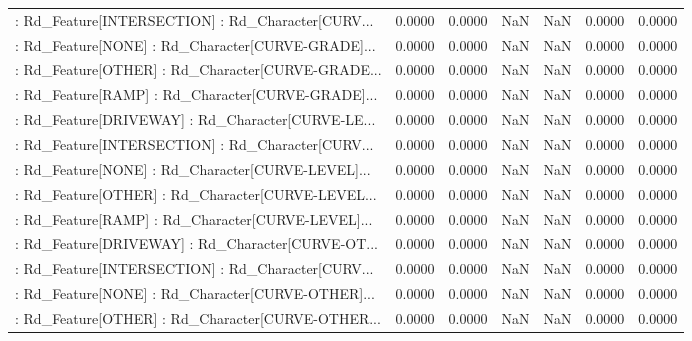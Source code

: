 \begin{longtable}{p{4cm}cccccc}
 : Rd\_Feature[INTERSECTION] : Rd\_Character[CURV... &            0.0000 &            0.0000 &     NaN &          NaN &             0.0000 &            0.0000 \\
 : Rd\_Feature[NONE] : Rd\_Character[CURVE-GRADE]... &            0.0000 &            0.0000 &     NaN &          NaN &             0.0000 &            0.0000 \\
 : Rd\_Feature[OTHER] : Rd\_Character[CURVE-GRADE... &            0.0000 &            0.0000 &     NaN &          NaN &             0.0000 &            0.0000 \\
 : Rd\_Feature[RAMP] : Rd\_Character[CURVE-GRADE]... &            0.0000 &            0.0000 &     NaN &          NaN &             0.0000 &            0.0000 \\
 : Rd\_Feature[DRIVEWAY] : Rd\_Character[CURVE-LE... &            0.0000 &            0.0000 &     NaN &          NaN &             0.0000 &            0.0000 \\
 : Rd\_Feature[INTERSECTION] : Rd\_Character[CURV... &            0.0000 &            0.0000 &     NaN &          NaN &             0.0000 &            0.0000 \\
 : Rd\_Feature[NONE] : Rd\_Character[CURVE-LEVEL]... &            0.0000 &            0.0000 &     NaN &          NaN &             0.0000 &            0.0000 \\
 : Rd\_Feature[OTHER] : Rd\_Character[CURVE-LEVEL... &            0.0000 &            0.0000 &     NaN &          NaN &             0.0000 &            0.0000 \\
 : Rd\_Feature[RAMP] : Rd\_Character[CURVE-LEVEL]... &            0.0000 &            0.0000 &     NaN &          NaN &             0.0000 &            0.0000 \\
 : Rd\_Feature[DRIVEWAY] : Rd\_Character[CURVE-OT... &            0.0000 &            0.0000 &     NaN &          NaN &             0.0000 &            0.0000 \\
 : Rd\_Feature[INTERSECTION] : Rd\_Character[CURV... &            0.0000 &            0.0000 &     NaN &          NaN &             0.0000 &            0.0000 \\
 : Rd\_Feature[NONE] : Rd\_Character[CURVE-OTHER]... &            0.0000 &            0.0000 &     NaN &          NaN &             0.0000 &            0.0000 \\
 : Rd\_Feature[OTHER] : Rd\_Character[CURVE-OTHER... &            0.0000 &            0.0000 &     NaN &          NaN &             0.0000 &            0.0000 \\

\end{longtable}

